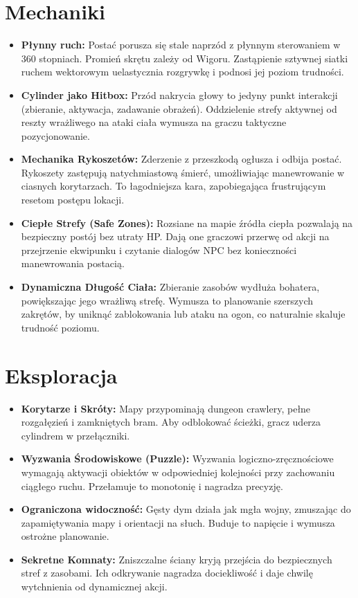\documentclass[12pt, letterpaper,Titlepage]{article}
\begin{document}
\section{Mechaniki}

\begin{itemize}
\item \textbf{Płynny ruch:} Postać porusza się stale naprzód z płynnym sterowaniem w 360 stopniach. Promień skrętu zależy od Wigoru. Zastąpienie sztywnej siatki ruchem wektorowym uelastycznia rozgrywkę i podnosi jej poziom trudności.

\item \textbf{Cylinder jako Hitbox:} Przód nakrycia głowy to jedyny punkt interakcji (zbieranie, aktywacja, zadawanie obrażeń). Oddzielenie strefy aktywnej od reszty wrażliwego na ataki ciała wymusza na graczu taktyczne pozycjonowanie.

\item \textbf{Mechanika Rykoszetów:} Zderzenie z przeszkodą ogłusza i odbija postać. Rykoszety zastępują natychmiastową śmierć, umożliwiając manewrowanie w ciasnych korytarzach. To łagodniejsza kara, zapobiegająca frustrującym resetom postępu lokacji.

\item \textbf{Ciepłe Strefy (Safe Zones):} Rozsiane na mapie źródła ciepła pozwalają na bezpieczny postój bez utraty HP. Dają one graczowi przerwę od akcji na przejrzenie ekwipunku i czytanie dialogów NPC bez konieczności manewrowania postacią.

\item \textbf{Dynamiczna Długość Ciała:} Zbieranie zasobów wydłuża bohatera, powiększając jego wrażliwą strefę. Wymusza to planowanie szerszych zakrętów, by uniknąć zablokowania lub ataku na ogon, co naturalnie skaluje trudność poziomu.
\end{itemize}
\section{Eksploracja}

\begin{itemize}
\item \textbf{Korytarze i Skróty:} Mapy przypominają dungeon crawlery, pełne rozgałęzień i zamkniętych bram. Aby odblokować ścieżki, gracz uderza cylindrem w przełączniki.
\item \textbf{Wyzwania Środowiskowe (Puzzle):} Wyzwania logiczno-zręcznościowe wymagają aktywacji obiektów w odpowiedniej kolejności przy zachowaniu ciągłego ruchu. Przełamuje to monotonię i nagradza precyzję.
\item \textbf{Ograniczona widoczność:} Gęsty dym działa jak mgła wojny, zmuszając do zapamiętywania mapy i orientacji na słuch. Buduje to napięcie i wymusza ostrożne planowanie.
\item \textbf{Sekretne Komnaty:} Zniszczalne ściany kryją przejścia do bezpiecznych stref z zasobami. Ich odkrywanie nagradza dociekliwość i daje chwilę wytchnienia od dynamicznej akcji.
\end{itemize}
\end{document}
